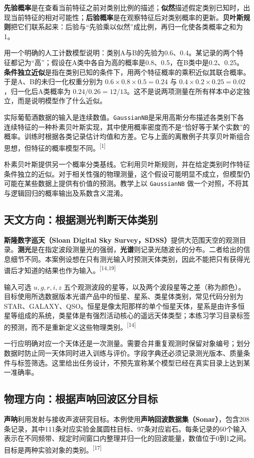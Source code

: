 \textbf{先验概率}是在查看当前特征之前对类别比例的描述；\textbf{似然}描述假定类别已知时，出现当前特征的相对可能性；\textbf{后验概率}是在观察特征后对类别概率的更新。\textbf{贝叶斯规则}把它们联系起来：后验与“先验乘以似然”成比例，再归一化使各类概率之和为1。

用一个明确的人工计数模型说明：类别A与B的先验为0.6、0.4。某记录的两个特征都记为“高”；假设在A类中各自为高的概率是0.8、0.5，在B类中是0.2、0.25。\textbf{条件独立近似}是指在类别已知的条件下，用两个特征概率的乘积近似其联合概率。于是A、B的未归一化权重分别为 $0.6\times0.8\times0.5=0.24$ 与 $0.4\times0.2\times0.25=0.02$，归一化后A类概率为 $0.24/0.26=12/13$。这不是说两项测量在所有样本中必定独立，而是说明模型作了什么近似。

实际葡萄酒数据的输入是连续数值。\texttt{GaussianNB}是采用高斯分布描述各类别下各连续特征的一种朴素贝叶斯实现，其中使用概率密度而不是“恰好等于某个实数”的概率。训练时根据各类记录估计均值和方差。它与上面的离散例子共享贝叶斯组合思想，但特征的概率模型不同。\textsuperscript{[1]}

朴素贝叶斯提供另一个概率分类基线。它利用贝叶斯规则，并在给定类别时作特征条件独立的近似。对于相关性强的物理测量，这个假设可能明显不成立，但模型仍可能在某些数据上提供有价值的预测。教学上以 \texttt{GaussianNB} 做一个对照，不将其与逻辑回归的概率输出及系数含义混淆。

\subsection*{天文方向：根据测光判断天体类别}
\label{sec:sdss-intro}
\textbf{斯隆数字巡天（Sloan Digital Sky Survey，SDSS）}提供大范围天空的观测目录。\textbf{测光}是在指定波段测量光的强弱，\textbf{光谱}则记录光随波长的分布。二者给出的信息细节不同。本案例设想在只有测光输入时预测天体类别，因此不能把只有获得光谱后才知道的结果也作为输入。\textsuperscript{[14,19]}

输入可选 $u,g,r,i,z$ 五个观测波段的星等，以及两个波段星等之差（称为颜色）。目标使用所选数据版本光谱产品中的恒星、星系、类星体类别，常见代码分别为STAR、GALAXY、QSO。恒星是像太阳那样的单个恒星天体，星系是由许多恒星等组成的系统，类星体是有强烈活动核心的遥远天体类型；本练习学习目录标签的预测，而不是重新定义这些物理类别。\textsuperscript{[14]}

一行应明确对应一个天体还是一次测量。需要合并重复观测时保留对象编号；划分数据时防止同一天体同时进入训练与评价。字段字典还必须记录测光版本、质量条件与标签筛选。这里给出任务设计，不预先宣称某个模型已经在真实目录上达到某一准确率。

\subsection*{物理方向：根据声呐回波区分目标}
\label{sec:sonar-intro}
\textbf{声呐}利用发射与接收声波研究目标。本例使用\textbf{声呐回波数据集（Sonar）}，包含208条记录，其中111条对应实验金属圆柱目标、97条对应岩石。每条记录的60个输入表示在不同频带、规定时间窗口内整理并归一化的回波能量，数值位于0到1之间。目标是两种实验对象的类别。\textsuperscript{[17]}

